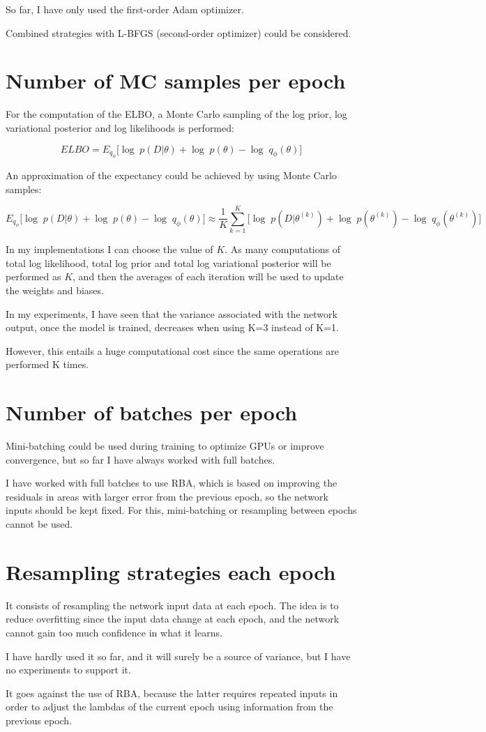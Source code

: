 \documentclass{article}
\begin{document}
So far, I have only used the first-order Adam optimizer.

Combined strategies with L-BFGS (second-order optimizer) could be considered.

\section{Number of MC samples per epoch}

For the computation of the ELBO, a Monte Carlo sampling of the log prior, log variational posterior and log likelihoods is performed:

$$
ELBO = E_{q_\phi} \Big[\log\;p(D|\theta) + \log\;p(\theta) - \log\;q_\phi(\theta)\Big]
$$

An approximation of the expectancy could be achieved by using Monte Carlo samples:

$$
E_{q_\phi} \Big[\log\;p(D|\theta) + \log\;p(\theta) - \log\;q_\phi(\theta)\Big] \approx
\frac{1}{K} \sum_{k=1}^K \Big[\log\;p(D|\theta^{(k)}) + \log\;p(\theta^{(k)}) - \log\;q_\phi(\theta^{(k)})\Big]
$$

In my implementations I can choose the value of $K$. As many computations of total log likelihood, total log prior and total log variational posterior will be performed as $K$, and then the averages of each iteration will be used to update the weights and biases.

In my experiments, I have seen that the variance associated with the network output, once the model is trained, decreases when using K=3 instead of K=1.

However, this entails a huge computational cost since the same operations are performed K times.

\section{Number of batches per epoch}

Mini-batching could be used during training to optimize GPUs or improve convergence, but so far I have always worked with full batches.

I have worked with full batches to use RBA, which is based on improving the residuals in areas with larger error from the previous epoch, so the network inputs should be kept fixed. For this, mini-batching or resampling between epochs cannot be used.

\section{Resampling strategies each epoch}

It consists of resampling the network input data at each epoch. The idea is to reduce overfitting since the input data change at each epoch, and the network cannot gain too much confidence in what it learns.

I have hardly used it so far, and it will surely be a source of variance, but I have no experiments to support it.

It goes against the use of RBA, because the latter requires repeated inputs in order to adjust the lambdas of the current epoch using information from the previous epoch.
\end{document}

